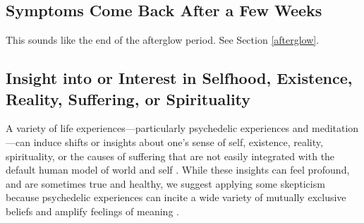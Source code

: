 \documentclass[12pt,letterpaper]{book}
\begin{document}
\subsection*{Symptoms Come Back After a Few Weeks}
This sounds like the end of the afterglow period. See Section \ref{afterglow}.
\subsection*{Insight into or Interest in Selfhood, Existence, Reality, Suffering, or Spirituality}
\label{selfinsight}
A variety of life experiences—particularly psychedelic experiences and meditation—can induce shifts or insights about one's sense of self, existence, reality, spirituality, or the causes of suffering that are not easily integrated with the default human model of world and self \cite{evans2020}. While these insights can feel profound, and are sometimes true and healthy, we suggest applying some skepticism because psychedelic experiences can incite a wide variety of mutually exclusive beliefs and amplify feelings of meaning \cite{hartogsohn2018meaning}.
\end{document}
